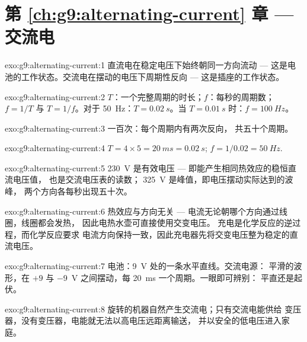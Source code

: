 \section*{第 \ref{ch:g9:alternating-current} 章 --- 交流电}

\begin{solution}{exo:g9:alternating-current:1}
直流电在稳定电压下始终朝同一方向流动 ---
这是电池的工作状态。交流电在摆动的电压下周期性反向 ---
这是插座的工作状态。
\end{solution}

\begin{solution}{exo:g9:alternating-current:2}
$T$：一个完整周期的时长；$f$：每秒的周期数；
$f = 1/T$ 与 $T = 1/f$。对于 \qty{50}{Hz}：$T =
\qty{0.02}{s}$。当 $T = \qty{0.01}{s}$ 时：$f = \qty{100}{Hz}$。
\end{solution}

\begin{solution}{exo:g9:alternating-current:3}
一百次：每个周期内有两次反向，
共五十个周期。
\end{solution}

\begin{solution}{exo:g9:alternating-current:4}
$T = 4 \times 5 = \qty{20}{ms} = \qty{0.02}{s}$; $f = 1/0.02
= \qty{50}{Hz}$.
\end{solution}

\begin{solution}{exo:g9:alternating-current:5}
\qty{230}{V} 是有效电压 --- 即能产生相同热效应的稳恒直流电压值，
也是交流电压表的读数；
\qty{325}{V} 是峰值，即电压摆动实际达到的波峰，
两个方向各每秒出现五十次。
\end{solution}

\begin{solution}{exo:g9:alternating-current:6}
热效应与方向无关 --- 电流无论朝哪个方向通过线圈，线圈都会发热，
因此电热水壶可直接使用交变电压。
充电是化学反应的逆过程，而化学反应要求
电流方向保持一致，因此充电器先将交变电压整为稳定的直流电压。
\end{solution}

\begin{solution}{exo:g9:alternating-current:7}
电池：\qty{9}{V} 处的一条水平直线。交流电源：
平滑的波形，在 $+9$ 与
\qty{-9}{V} 之间摆动，每 \qty{20}{ms} 一个周期。一眼即可辨别：
平直还是起伏。
\end{solution}

\begin{solution}{exo:g9:alternating-current:8}
旋转的机器自然产生交流电；只有交流电能供给
变压器，没有变压器，电能就无法以高电压远距离输送，
并以安全的低电压进入家庭。
\end{solution}

